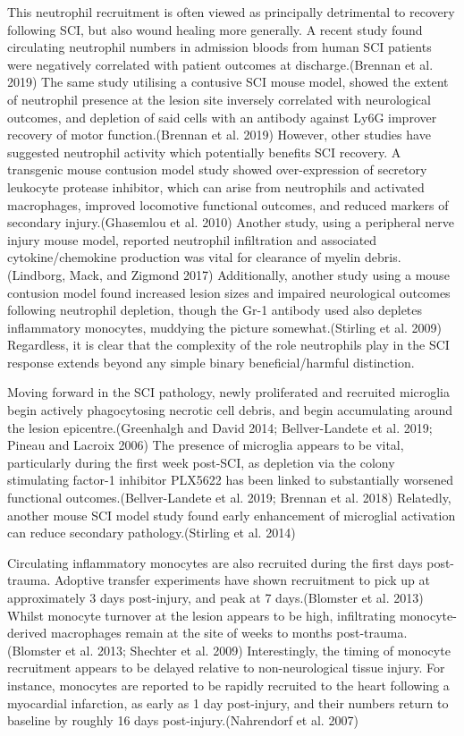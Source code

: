 \documentclass[9pt,lineno]{elife}
\begin{document}
This neutrophil recruitment is often viewed as principally detrimental to recovery following SCI, but also wound healing more generally.
A recent study found circulating neutrophil numbers in admission bloods from human SCI patients were negatively correlated with patient outcomes at discharge.(Brennan et al. 2019)
The same study utilising a contusive SCI mouse model, showed the extent of neutrophil presence at the lesion site inversely correlated with neurological outcomes, and depletion of said cells with an antibody against Ly6G improver recovery of motor function.(Brennan et al. 2019)
However, other studies have suggested neutrophil activity which potentially benefits SCI recovery.
A transgenic mouse contusion model study showed over-expression of secretory leukocyte protease inhibitor, which can arise from neutrophils and activated macrophages, improved locomotive functional outcomes, and reduced markers of secondary injury.(Ghasemlou et al. 2010)
Another study, using a peripheral nerve injury mouse model, reported neutrophil infiltration and associated cytokine/chemokine production was vital for clearance of myelin debris.(Lindborg, Mack, and Zigmond 2017)
Additionally, another study using a mouse contusion model found increased lesion sizes and impaired neurological outcomes following neutrophil depletion, though the Gr-1 antibody used also depletes inflammatory monocytes, muddying the picture somewhat.(Stirling et al. 2009)
Regardless, it is clear that the complexity of the role neutrophils play in the SCI response extends beyond any simple binary beneficial/harmful distinction.

Moving forward in the SCI pathology, newly proliferated and recruited microglia begin actively phagocytosing necrotic cell debris, and begin accumulating around the lesion epicentre.(Greenhalgh and David 2014; Bellver-Landete et al. 2019; Pineau and Lacroix 2006)
The presence of microglia appears to be vital, particularly during the first week post-SCI, as depletion via the colony stimulating factor-1 inhibitor PLX5622 has been linked to substantially worsened functional outcomes.(Bellver-Landete et al. 2019; Brennan et al. 2018)
Relatedly, another mouse SCI model study found early enhancement of microglial activation can reduce secondary pathology.(Stirling et al. 2014)

Circulating inflammatory monocytes are also recruited during the first days post-trauma.
Adoptive transfer experiments have shown recruitment to pick up at approximately 3 days post-injury, and peak at 7 days.(Blomster et al. 2013)
Whilst monocyte turnover at the lesion appears to be high, infiltrating monocyte-derived macrophages remain at the site of weeks to months post-trauma.(Blomster et al. 2013; Shechter et al. 2009)
Interestingly, the timing of monocyte recruitment appears to be delayed relative to non-neurological tissue injury.
For instance, monocytes are reported to be rapidly recruited to the heart following a myocardial infarction, as early as 1 day post-injury, and their numbers return to baseline by roughly 16 days post-injury.(Nahrendorf et al. 2007)
\end{document}
